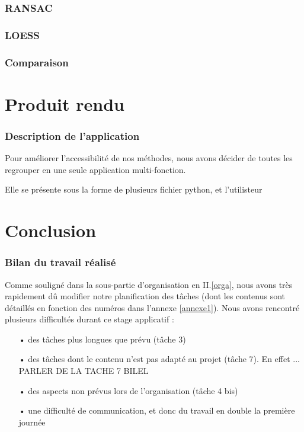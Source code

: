 \documentclass[a4paper,12pt]{article} %
\begin{document}
            
    \section{RANSAC}
    \section{LOESS}
    \section{Comparaison}
    
      
    
    
\renewcommand\partname{}
\part{Produit rendu}

\section{Description de l'application}

Pour améliorer l'accessibilité de nos méthodes, nous avons décider de toutes les regrouper en une seule application multi-fonction.

Elle se présente sous la forme de plusieurs fichier python, et l'utilisteur 

\renewcommand\partname{}
\part{Conclusion}
	\section{Bilan du travail réalisé}
    Comme souligné dans la sous-partie d'organisation en II.\ref{orga}, nous avons très rapidement dû modifier notre planification des tâches (dont les contenus sont détaillés en fonction des numéros dans l'annexe \ref{annexe1}). Nous avons rencontré plusieurs difficultés durant ce stage applicatif :
    \begin{itemize}
        \item [•] des tâches plus longues que prévu (tâche 3)
        \item [•]  des tâches dont le contenu n'est pas adapté au projet (tâche 7). En effet ... PARLER DE LA TACHE 7 BILEL 
        \item [•]  des aspects non prévus lors de l'organisation (tâche 4 bis)
        \item [•]  une difficulté de communication, et donc du travail en double la première journée
    \end{itemize}
    
\end{document}
